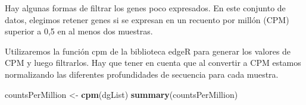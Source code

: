 \documentclass[
]{article}
\newenvironment{Shaded}{\begin{snugshade}}{\end{snugshade}}
\newcommand{\KeywordTok}[1]{\textcolor[rgb]{0.13,0.29,0.53}{\textbf{#1}}}
\newcommand{\NormalTok}[1]{#1}
\newcommand{\StringTok}[1]{\textcolor[rgb]{0.31,0.60,0.02}{#1}}
\begin{document}
Hay algunas formas de filtrar los genes poco expresados. En este
conjunto de datos, elegimos retener genes si se expresan en un recuento
por millón (CPM) superior a 0,5 en al menos dos muestras.

Utilizaremos la función cpm de la biblioteca edgeR para generar los
valores de CPM y luego filtrarlos. Hay que tener en cuenta que al
convertir a CPM estamos normalizando las diferentes profundidades de
secuencia para cada muestra.

\begin{Shaded}
\begin{Highlighting}[]
\NormalTok{countsPerMillion <-}\StringTok{ }\KeywordTok{cpm}\NormalTok{(dgList)}
\KeywordTok{summary}\NormalTok{(countsPerMillion)}
\end{Highlighting}
\end{Shaded}
\end{document}
